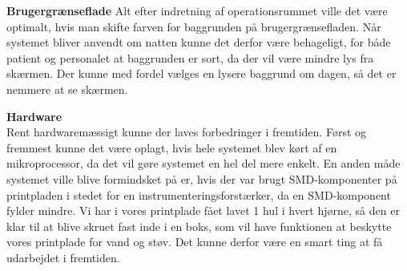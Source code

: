 \textbf{Brugergrænseflade}
Alt efter indretning af operationsrummet ville det være optimalt, hvis man skifte farven for baggrunden på brugergrænsefladen. Når systemet bliver anvendt om natten kunne det derfor være behageligt, for både patient og personalet at baggrunden er sort, da der vil være mindre lys fra skærmen. Der kunne med fordel vælges en lysere baggrund om dagen, så det er nemmere at se skærmen.

\textbf{Hardware}
\\Rent hardwaremæssigt kunne der laves forbedringer i fremtiden. Først og fremmest kunne det være oplagt, hvis hele systemet blev kørt af en mikroprocessor, da det vil gøre systemet en hel del mere enkelt. En anden måde systemet ville blive formindsket på er, hvis der var brugt SMD-komponenter på printpladen i stedet for en instrumenteringsforstærker, da en SMD-komponent fylder mindre.
Vi har i vores printplade fået lavet 1 hul i hvert hjørne, så den er klar til at blive skruet fast inde i en boks, som vil have funktionen at beskytte vores printplade for vand og støv. Det kunne derfor være en smart ting at få udarbejdet i fremtiden.
